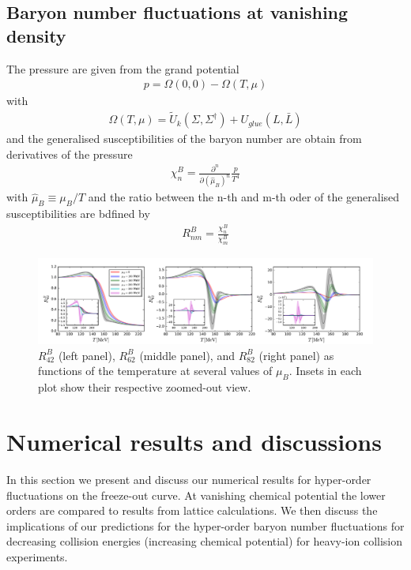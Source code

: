 \documentclass[%
reprint,
superscriptaddress,
showpacs,preprintnumbers,
amsmath,amssymb,
aps,
prd,
]{revtex4-1}
\begin{document}
\subsection{Baryon number fluctuations at vanishing density}

The pressure are given from the grand potential
\begin{align}
p=\Omega(0,0)-\Omega(T,\mu)
\end{align}
with 
\begin{align}
\Omega(T,\mu)=\tilde{U}_{k}(\Sigma,\Sigma^\dagger)+U_{glue}(L,\bar L)
\end{align}
and the generalised susceptibilities of the baryon number are obtain from derivatives of the pressure
\begin{align}
\chi_n^B=\frac{\partial^n}{\partial (\hat \mu_B)^n}\frac{p}{T^4}
\end{align}
with $\hat \mu_B\equiv \mu_B/T$
and the ratio between the n-th and m-th oder of the generalised susceptibilities are bdfined by
\begin{align}
R^B_{nm}=\frac{\chi_n^B}{\chi_m^B}
\end{align}


\begin{figure}[t]
\includegraphics[width=1.\textwidth]{R42R62R82-T-muB0to400}
\caption{$R^{B}_{42}$ (left panel), $R^{B}_{62}$ (middle panel), and $R^{B}_{82}$ (right panel) as functions of the temperature at several values of $\mu_B$. Insets in each plot show their respective zoomed-out view. }\label{fig:R42R62R82-T-muB0to400}
\end{figure}
%


\section{Numerical results and discussions}
\label{sec:num}

In this section we present and discuss our numerical results for hyper-order fluctuations on the freeze-out curve. At vanishing chemical potential the lower orders are compared to results from lattice calculations. We then discuss the implications of our predictions for the hyper-order baryon number fluctuations for decreasing collision energies (increasing chemical potential) for heavy-ion collision experiments. 
\end{document}
